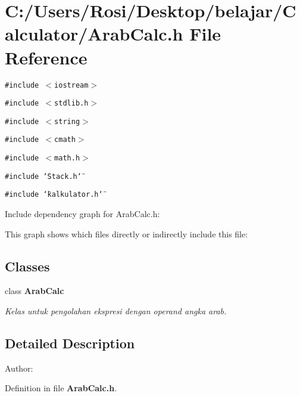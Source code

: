 \section{C:/Users/Rosi/Desktop/belajar/Calculator/Arab\-Calc.h File Reference}
\label{_arab_calc_8h}
{\tt \#include $<$iostream$>$}\par
{\tt \#include $<$stdlib.h$>$}\par
{\tt \#include $<$string$>$}\par
{\tt \#include $<$cmath$>$}\par
{\tt \#include $<$math.h$>$}\par
{\tt \#include \char`\"{}Stack.h\char`\"{}}\par
{\tt \#include \char`\"{}kalkulator.h\char`\"{}}\par


Include dependency graph for Arab\-Calc.h:

This graph shows which files directly or indirectly include this file:\subsection*{Classes}
\begin{CompactItemize}
\item 
class {\bf Arab\-Calc}
\begin{CompactList}\small\item\em Kelas untuk pengolahan ekspresi dengan operand angka arab. \item\end{CompactList}\end{CompactItemize}


\subsection{Detailed Description}
\begin{Desc}
\item[Author:]\end{Desc}


Definition in file {\bf Arab\-Calc.h}.